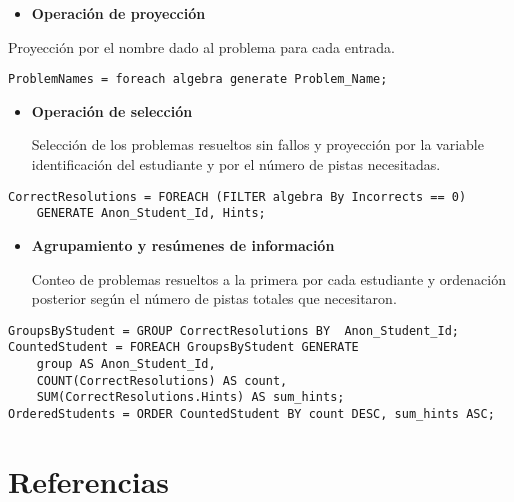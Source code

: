 \documentclass[11pt]{article}
\begin{document}
\begin{itemize}
\item \textbf{Operación de proyección}
\end{itemize}

Proyección por el nombre dado al problema para cada entrada. 

\begin{verbatim}
ProblemNames = foreach algebra generate Problem_Name;
\end{verbatim}

\begin{itemize}
\item \textbf{Operación de selección}

  Selección de los problemas resueltos sin fallos y proyección por
la variable identificación del estudiante y por el número de pistas
necesitadas.
\end{itemize}

\begin{verbatim}
CorrectResolutions = FOREACH (FILTER algebra By Incorrects == 0) 
	GENERATE Anon_Student_Id, Hints;
\end{verbatim}

\begin{itemize}
\item \textbf{Agrupamiento y resúmenes de información}

Conteo de problemas resueltos a la primera por cada estudiante y
ordenación posterior según el número de pistas totales que
necesitaron.
\end{itemize}

\begin{verbatim}
GroupsByStudent = GROUP CorrectResolutions BY  Anon_Student_Id;
CountedStudent = FOREACH GroupsByStudent GENERATE 
	group AS Anon_Student_Id, 
	COUNT(CorrectResolutions) AS count, 
	SUM(CorrectResolutions.Hints) AS sum_hints;
OrderedStudents = ORDER CountedStudent BY count DESC, sum_hints ASC;
\end{verbatim}

\section{Referencias}
\label{sec:orgf29b0b6}


\end{document}
